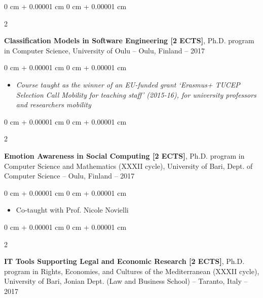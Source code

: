 \documentclass[10pt, a4paper]{article}
\newenvironment{highlights}{
    \begin{itemize}[
        topsep=0.10 cm,
        parsep=0.10 cm,
        partopsep=0pt,
        itemsep=0pt,
        leftmargin=0 cm + 10pt
    ]
}{
    \end{itemize}
} %
\newenvironment{onecolentry}{
    \begin{adjustwidth}{
        0 cm + 0.00001 cm
    }{
        0 cm + 0.00001 cm
    }
}{
    \end{adjustwidth}
} %
\newenvironment{twocolentry}[2][]{
    \onecolentry
    \def\secondColumn{#2}
    \setcolumnwidth{\fill, 4.5 cm}
    \begin{paracol}{2}
}{
    \switchcolumn \raggedleft \secondColumn
    \end{paracol}
    \endonecolentry
} %
\begin{document}
        \vspace{0.2 cm}

        \begin{twocolentry}{
            2016 – 2017
        }
            \textbf{Classification Models in Software Engineering [2 ECTS]}, Ph.D. program in Computer Science, University of Oulu -- Oulu, Finland\end{twocolentry}

        \vspace{0.10 cm}
        \begin{onecolentry}
            \begin{highlights}
                \item \textit{Course taught as the winner of an EU-funded grant `Erasmus+ TUCEP Selection Call Mobility for teaching staff' (2015-16), for university professors and researchers mobility}
            \end{highlights}
        \end{onecolentry}


        \vspace{0.2 cm}

        \begin{twocolentry}{
            2016 – 2017
        }
            \textbf{Emotion Awareness in Social Computing [2 ECTS]}, Ph.D. program in Computer Science and Mathematics (XXXII cycle), University of Bari, Dept. of Computer Science -- Oulu, Finland\end{twocolentry}

        \vspace{0.10 cm}
        \begin{onecolentry}
            \begin{highlights}
                \item Co-taught with Prof. Nicole Novielli
            \end{highlights}
        \end{onecolentry}


        \vspace{0.2 cm}

        \begin{twocolentry}{
            2016 – 2017
        }
            \textbf{IT Tools Supporting Legal and Economic Research [2 ECTS]}, Ph.D. program in Rights, Economies, and Cultures of the Mediterranean (XXXII cycle), University of Bari, Jonian Dept. (Law and Business School) -- Taranto, Italy\end{twocolentry}
\end{document}
